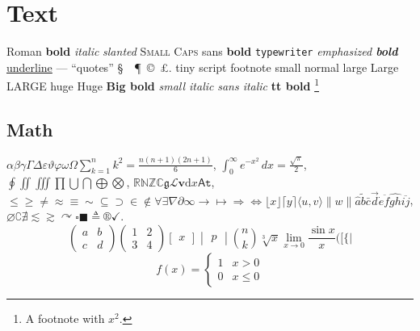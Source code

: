\section{Text}
Roman \textbf{bold} \textit{italic} \textsl{slanted} \textsc{Small Caps} \textsf{sans \textbf{bold}}
\texttt{typewriter} \emph{emphasized \textbf{bold}} \underline{underline} --- ``quotes'' \S\ \dag\ \P\ \copyright\ \pounds.
{\tiny tiny} {\scriptsize script} {\footnotesize footnote} {\small small} {\normalsize normal}
{\large large} {\Large Large} {\LARGE LARGE} {\huge huge} {\Huge Huge}
{\bfseries\Large Big bold} {\itshape\small small italic} {\sffamily\itshape sans italic} {\ttfamily\bfseries tt bold}
\footnote{A footnote with $x^2$.}

\subsection{Math}
$\alpha\beta\gamma\Gamma\Delta\varepsilon\vartheta\varphi\omega\Omega \sum_{k=1}^n k^2=\frac{n(n+1)(2n+1)}{6}$,
$\int_0^\infty e^{-x^2}\,dx=\frac{\sqrt\pi}{2}$, $\oint \iint \iiint \prod \bigcup \bigcap \bigoplus \bigotimes$,
$\mathbb{R}\mathbb{N}\mathbb{Z}\mathbb{C}\mathfrak{g}\mathcal{L}\mathbf{v}\mathrm{d}\mathit{x}\mathsf{A}\mathtt{t}$,
$\leq\geq\neq\approx\equiv\sim\subseteq\supset\in\notin\forall\exists\nabla\partial\infty\to\mapsto\Rightarrow\Leftrightarrow
\lfloor x\rfloor\lceil y\rceil\langle u,v\rangle\|w\|\hat a\tilde b\bar c\vec d\dot e\ddot f\widehat{gh}\overline{ij}$,
$\varnothing\complement\nexists\lesssim\gtrsim\curvearrowright\square\blacksquare\triangleq\circledR\checkmark$.
\[ \left( \begin{array}{cc} a & b \\ c & d \end{array} \right)
   \begin{pmatrix} 1 & 2 \\ 3 & 4 \end{pmatrix} \begin{bmatrix} x \end{bmatrix} \begin{vmatrix} p \end{vmatrix}
   \binom{n}{k} \sqrt[3]{x} \lim_{x\to 0}\frac{\sin x}{x} \Bigg( \bigg[ \Big\{ \big| \]
\begin{equation} f(x)=\begin{cases} 1 & x>0\\ 0 & x\le 0\end{cases} \label{eq:f} \end{equation}
